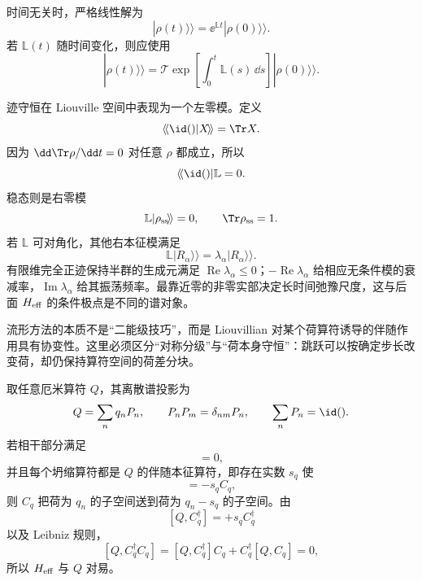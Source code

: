 时间无关时，严格线性解为
\begin{equation}
|\rho(t)\!\rangle\!\rangle
=\ee^{\mathbb L t}|\rho(0)\!\rangle\!\rangle.
\label{eq:phys-oqs-liouvillian-exponential}
\end{equation}
若 $\mathbb L(t)$ 随时间变化，则应使用
\begin{equation}
|\rho(t)\!\rangle\!\rangle
=\mathcal T\exp\!\left[\int_0^t\mathbb L(s)\,\dd s\right]
|\rho(0)\!\rangle\!\rangle.
\label{eq:phys-oqs-time-dependent-liouvillian}
\end{equation}

迹守恒在 Liouville 空间中表现为一个左零模。定义
\[
\langle\!\langle\id()|X\!\rangle\!\rangle=\Tr X.
\]
因为 $\dd\Tr\rho/\dd t=0$ 对任意 $\rho$ 都成立，所以
\begin{equation}
\langle\!\langle\id()|\mathbb L=0.
\label{eq:phys-oqs-left-zero-mode}
\end{equation}
稳态则是右零模
\begin{equation}
\mathbb L|\rho_{\rm ss}\!\rangle\!\rangle=0,
\qquad \Tr\rho_{\rm ss}=1.
\label{eq:phys-oqs-steady-state-liouvillian}
\end{equation}
若 $\mathbb L$ 可对角化，其他右本征模满足
\[
\mathbb L|R_\alpha\!\rangle\!\rangle
=\lambda_\alpha|R_\alpha\!\rangle\!\rangle.
\]
有限维完全正迹保持半群的生成元满足 $\operatorname{Re}\lambda_\alpha\le0$；$-\operatorname{Re}\lambda_\alpha$ 给相应无条件模的衰减率，$\operatorname{Im}\lambda_\alpha$ 给其振荡频率。最靠近零的非零实部决定长时间弛豫尺度，这与后面 $H_{\rm eff}$ 的条件极点是不同的谱对象。

流形方法的本质不是“二能级技巧”，而是 Liouvillian 对某个荷算符诱导的伴随作用具有协变性。这里必须区分“对称分级”与“荷本身守恒”：跳跃可以按确定步长改变荷，却仍保持算符空间的荷差分块。

取任意厄米算符 $Q$，其离散谱投影为
\begin{equation}
Q=\sum_n q_nP_n,
\qquad
P_nP_m=\delta_{nm}P_n,
\qquad
\sum_nP_n=\id().
\label{eq:phys-oqs-general-charge-projectors}
\end{equation}
若相干部分满足
\begin{equation}
[Q,H]=0,
\label{eq:phys-oqs-charge-conserving-h}
\end{equation}
并且每个坍缩算符都是 $Q$ 的伴随本征算符，即存在实数 $s_q$ 使
\begin{equation}
[Q,C_q]=-s_qC_q,
\label{eq:phys-oqs-charge-jump}
\end{equation}
则 $C_q$ 把荷为 $q_n$ 的子空间送到荷为 $q_n-s_q$ 的子空间。由
\[
[Q,C_q^\dagger]=+s_qC_q^\dagger
\]
以及 Leibniz 规则，
\[
[Q,C_q^\dagger C_q]
=[Q,C_q^\dagger]C_q+C_q^\dagger[Q,C_q]=0,
\]
所以 $H_{\rm eff}$ 与 $Q$ 对易。

